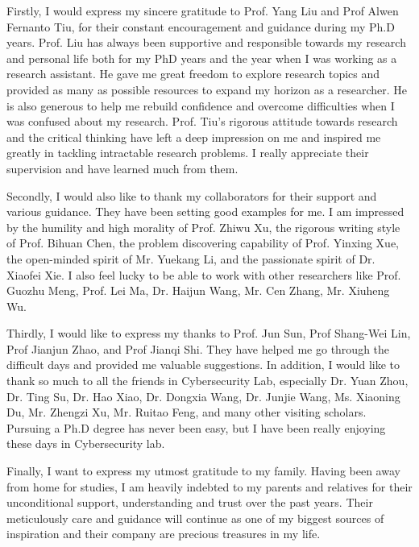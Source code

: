Firstly, I would express my sincere gratitude to Prof. Yang Liu and Prof Alwen Fernanto Tiu, for their constant encouragement and guidance during my Ph.D years. Prof. Liu has always been supportive and responsible towards my research and personal life both for my PhD years and the year when I was working as a research assistant. He gave me great freedom to explore research topics and provided as many as possible resources to expand my horizon as a researcher. He is also generous to help me rebuild confidence and overcome difficulties when I was confused about my research. Prof. Tiu's rigorous attitude towards research and the critical thinking have left a deep impression on me and inspired me greatly in tackling intractable research problems. I really appreciate their supervision and have learned much from them.

Secondly, I would also like to thank my collaborators for their support and various guidance. They have been setting good examples for me. I am impressed by the humility and high morality of Prof. Zhiwu Xu, the rigorous writing style of Prof. Bihuan Chen, the problem discovering capability of Prof. Yinxing Xue, the open-minded spirit of Mr. Yuekang Li, and the passionate spirit of Dr. Xiaofei Xie. I also feel lucky to be able to work with other researchers like Prof. Guozhu Meng, Prof. Lei Ma, Dr. Haijun Wang, Mr. Cen Zhang, Mr. Xiuheng Wu.

Thirdly, I would like to express my thanks to Prof. Jun Sun, Prof Shang-Wei Lin, Prof Jianjun Zhao, and Prof Jianqi Shi. They have helped me go through the difficult days and provided me valuable suggestions. In addition, I would like to thank so much to all the friends in Cybersecurity Lab, especially Dr. Yuan Zhou, Dr. Ting Su, Dr. Hao Xiao, Dr. Dongxia Wang, Dr. Junjie Wang, Ms. Xiaoning Du, Mr. Zhengzi Xu, Mr. Ruitao Feng, and many other visiting scholars. Pursuing a Ph.D degree has never been easy, but I have been really enjoying these days in Cybersecurity lab.

Finally, I want to express my utmost gratitude to my family. Having been away from home for studies, I am heavily indebted to my parents and relatives for their unconditional support, understanding and trust over the past years. Their meticulously care and guidance will continue as one of my biggest sources of inspiration and their company are precious treasures in my life.